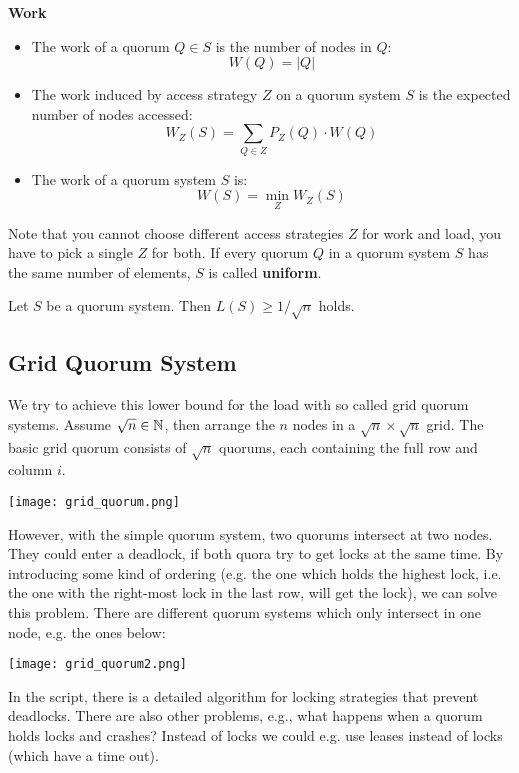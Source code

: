 \textbf{Work}
\begin{itemize}
	\item The work of a quorum $Q \in S$ is the number of nodes in $Q$:
		  $$W(Q) = |Q|$$
	
	\item The work induced by access strategy $Z$ on a quorum system $S$ is the expected number of nodes accessed:
		  $$W_Z(S) = \sum_{Q \in Z} P_Z(Q) \cdot W(Q)$$
		
	\item The work of a quorum system $S$ is: 
		  $$W(S) = \min_Z W_Z(S)$$
\end{itemize}

Note that you cannot choose different access strategies $Z$ for work and load, you have to pick a single $Z$ for both. If every quorum $Q$ in a quorum system $S$ has the same number of elements, $S$ is called \textbf{uniform}. \medskip

Let $S$ be a quorum system. Then $L(S) \geq 1 / \sqrt{n}$ holds.


\subsection{Grid Quorum System}

We try to achieve this lower bound for the load with so called grid quorum systems. Assume $\sqrt n \in \mathbb{N}$, then arrange the $n$ nodes in a $\sqrt n \times \sqrt n$ grid. The basic grid quorum consists of $\sqrt n$ quorums, each containing the full row and column $i$.
\begin{center}
	\texttt{[image: grid\_quorum.png]}
\end{center}

However, with the simple quorum system, two quorums intersect at two nodes. They could enter a deadlock, if both quora try to get locks at the same time. By introducing some kind of ordering (e.g. the one which holds the highest lock, i.e. the one with the right-most lock in the last row, will get the lock), we can solve this problem. There are different quorum systems which only intersect in one node, e.g. the ones below:
\begin{center}
	\texttt{[image: grid\_quorum2.png]}
\end{center}

In the script, there is a detailed algorithm for locking strategies that prevent deadlocks. There are also other problems, e.g., what happens when a quorum holds locks and crashes? Instead of locks we could e.g. use leases instead of locks (which have a time out).


